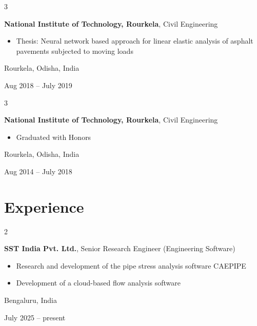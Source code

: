 \documentclass[10pt, letterpaper]{article}
\newenvironment{highlights}{
    \begin{itemize}[
        topsep=0.10 cm,
        parsep=0.10 cm,
        partopsep=0pt,
        itemsep=0pt,
        leftmargin=0.4 cm + 10pt
    ]
}{
    \end{itemize}
} %
\newenvironment{twocolentry}[2][]{
    \onecolentry
    \def\secondColumn{#2}
    \setcolumnwidth{\fill, 4.5 cm}
    \begin{paracol}{2}
}{
    \switchcolumn \raggedleft \secondColumn
    \end{paracol}
    \endonecolentry
} %
\newenvironment{threecolentry}[3][]{
    \onecolentry
    \def\thirdColumn{#3}
    \setcolumnwidth{1 cm, \fill, 4.5 cm}
    \begin{paracol}{3}
    {\raggedright #2} \switchcolumn
}{
    \switchcolumn \raggedleft \thirdColumn
    \end{paracol}
    \endonecolentry
} %
\begin{document}
        \vspace{0.2 cm}

        \begin{threecolentry}{\textbf{}}{
            Rourkela, Odisha, India

        Aug 2018 – July 2019
        }
            \textbf{National Institute of Technology, Rourkela}, Civil Engineering
            \begin{highlights}
                \item Thesis: Neural network based approach for linear elastic analysis of asphalt pavements subjected to moving loads
            \end{highlights}
        \end{threecolentry}

        \vspace{0.2 cm}

        \begin{threecolentry}{\textbf{}}{
            Rourkela, Odisha, India

        Aug 2014 – July 2018
        }
            \textbf{National Institute of Technology, Rourkela}, Civil Engineering
            \begin{highlights}
                \item Graduated with Honors
            \end{highlights}
        \end{threecolentry}


    
    \section{Experience}



        
        \begin{twocolentry}{
            Bengaluru, India

        July 2025 – present
        }
            \textbf{SST India Pvt. Ltd.}, Senior Research Engineer (Engineering Software)
            \begin{highlights}
                \item Research and development of the pipe stress analysis software CAEPIPE
                \item Development of a cloud-based flow analysis software
            \end{highlights}
        \end{twocolentry}
\end{document}
